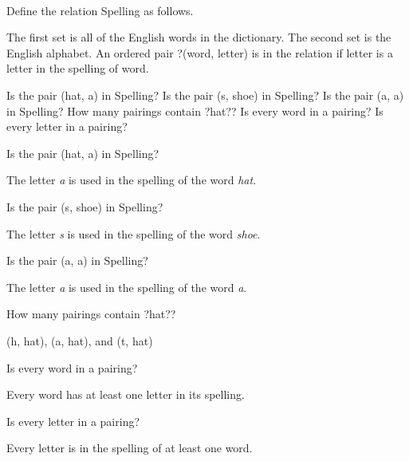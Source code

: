 \documentclass{ximera}
\begin{document}
\begin{exercise}
\quad \\
Define the relation Spelling as follows.

The first set is all of the English words in the dictionary. The second set is the English alphabet. An ordered pair ?(word, letter) is in the relation if letter is a letter in the spelling of word.

Is the pair (hat, a) in Spelling?
Is the pair (s, shoe) in Spelling?
Is the pair (a, a) in Spelling?
How many pairings contain ?hat??
Is every word in a pairing?
Is every letter in a pairing?


\begin{problem} Is the pair (hat, a) in Spelling? 
\begin{feedback}
The letter \textit{a} is used in the spelling of the word \textit{hat}.
\end{feedback}
\end{problem}


\begin{problem} Is the pair (s, shoe) in Spelling? 
\begin{feedback}
The letter \textit{s} is used in the spelling of the word \textit{shoe}.
\end{feedback}
\end{problem}


\begin{problem} Is the pair (a, a) in Spelling? 
\begin{feedback}
The letter \textit{a} is used in the spelling of the word \textit{a}.
\end{feedback}
\end{problem}


\begin{problem} How many pairings contain ?hat?? 
\begin{feedback}
(h, hat), (a, hat), and (t, hat)
\end{feedback}
\end{problem}


\begin{problem} Is every word in a pairing? 
\begin{feedback}
Every word has at least one letter in its spelling.
\end{feedback}
\end{problem}


\begin{problem} Is every letter in a pairing? 
\begin{feedback}
Every letter is in the spelling of at least one word.
\end{feedback}
\end{problem}




\end{exercise}
\end{document}

